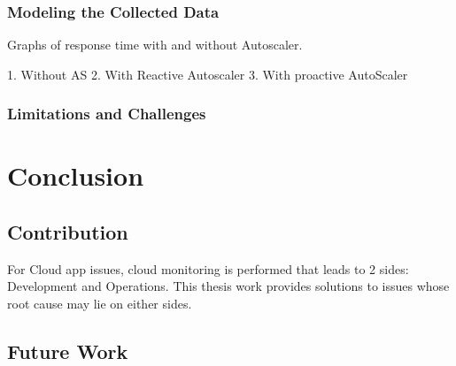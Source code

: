 \documentclass[article,type=msc,colorback,12pt,accentcolor=tud7b]{tudthesis}
\begin{document}
	\subsubsection{Modeling the Collected Data}
	
	Graphs of response time with and without Autoscaler.
	
	1. Without AS
	2. With Reactive Autoscaler
	3. With proactive AutoScaler
	
	\subsubsection{Limitations and Challenges}
	 
 \cleardoublepage
 \section{Conclusion}	  
\subsection{Contribution}
	 
	For Cloud app issues, cloud monitoring is performed that leads to 2 sides: Development and Operations. This thesis work provides solutions to issues whose root cause may lie on either sides.	 
	 
	 \subsection{Future Work}

\clearpage
	  

	  
\end{document}
